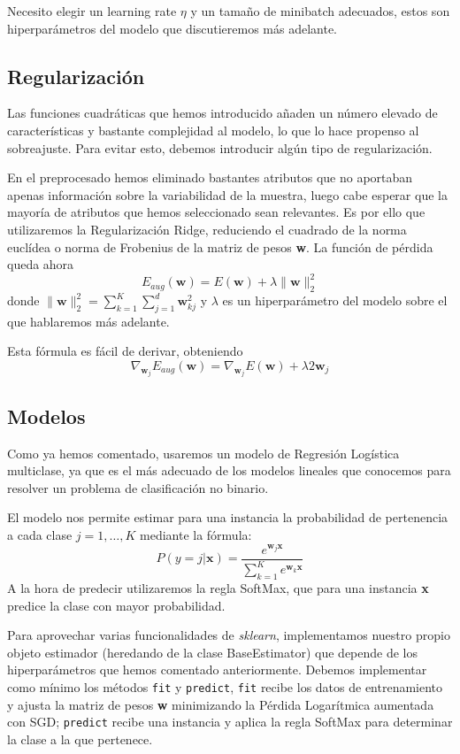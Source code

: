\documentclass[a4]{article}
\begin{document}
Necesito elegir un learning rate $\eta$ y un tamaño de minibatch
adecuados, estos son hiperparámetros del modelo que discutieremos más
adelante.

\subsection{Regularización}

Las funciones cuadráticas que hemos introducido añaden un número
elevado de características y bastante complejidad al modelo, lo que lo
hace propenso al sobreajuste. Para evitar esto, debemos introducir
algún tipo de regularización.

En el preprocesado hemos eliminado bastantes atributos que no
aportaban apenas información sobre la variabilidad de la muestra,
luego cabe esperar que la mayoría de atributos que hemos seleccionado
sean relevantes. Es por ello que utilizaremos la Regularización Ridge,
reduciendo el cuadrado de la norma euclídea o norma de Frobenius de la
matriz de pesos \textbf{w}. La función de pérdida queda ahora
\vspace{-2mm}
\[E_{aug}(\textbf{w})=E(\textbf{w})+\lambda
  \|\textbf{w}\|_2^2\]\vspace{-2mm} donde
$\|\textbf{w}\|_2^2=\sum\limits_{k=1}^K\sum\limits_{j=1}^d
\textbf{w}_{kj}^2$ y $\lambda$ es un hiperparámetro del modelo sobre
el que hablaremos más adelante.

Esta fórmula es fácil de derivar, obteniendo \vspace{-2mm}
\[\nabla_{\textbf{w}_j}E_{aug}(\textbf{w})=\nabla_{\textbf{w}_j}E(\textbf{w})+\lambda 2\textbf{w}_j\]

\subsection{Modelos}

Como ya hemos comentado, usaremos un modelo de Regresión Logística
multiclase, ya que es el más adecuado de los modelos lineales que
conocemos para resolver un problema de clasificación no binario.

El modelo nos permite estimar para una instancia la probabilidad de
pertenencia a cada clase $j=1,\ldots,K$ mediante la fórmula:
\[P(y=j|\textbf{x})=\frac{e^{\textbf{w}_j \textbf{x}}}{\sum_{k=1}^K
    e^{\textbf{w}_k \textbf{x}}}\] A la hora de predecir utilizaremos
la regla SoftMax, que para una instancia \textbf{x} predice la
clase con mayor probabilidad.

Para aprovechar varias funcionalidades de \textit{sklearn},
implementamos nuestro propio objeto estimador (heredando de la clase
BaseEstimator) que depende de los hiperparámetros que hemos comentado
anteriormente. Debemos implementar como mínimo los métodos
\texttt{fit} y \texttt{predict}, \texttt{fit} recibe los datos de
entrenamiento y ajusta la matriz de pesos \textbf{w} minimizando la
Pérdida Logarítmica aumentada con SGD; \texttt{predict} recibe una
instancia y aplica la regla SoftMax para determinar la clase a la que
pertenece.
\end{document}
